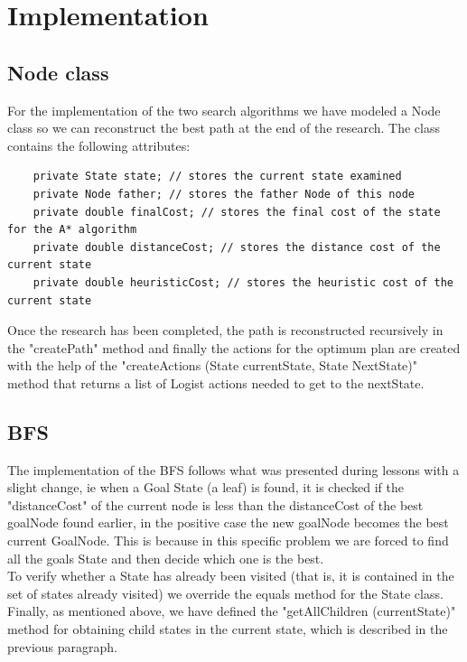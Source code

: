 \documentclass[11pt]{article}
\begin{document}
\section{Implementation}

\subsection {Node class}
For the implementation of the two search algorithms we have modeled a Node class so we can reconstruct the best path at the end of the research. The class contains the following attributes:
\begin{lstlisting}
    private State state; // stores the current state examined
    private Node father; // stores the father Node of this node
    private double finalCost; // stores the final cost of the state for the A* algorithm
    private double distanceCost; // stores the distance cost of the current state
    private double heuristicCost; // stores the heuristic cost of the current state
\end{lstlisting}Once the research has been completed, the path is reconstructed recursively in the "createPath" method and finally the actions for the optimum plan are created with the help of the "createActions (State currentState, State NextState)" method that returns a list of Logist actions needed to get to the nextState.

\subsection{BFS}
The implementation of the BFS follows what was presented during lessons with a slight change, ie when a Goal State (a leaf) is found, it is checked if the "distanceCost" of the current node is less than the distanceCost of the best goalNode found earlier, in the positive case the new goalNode becomes the best current GoalNode. This is because in this specific problem we are forced to find all the goals State and then decide which one is the best.
\\
To verify whether a State has already been visited (that is, it is contained in the set of states already visited) we override the equals method for the State class. Finally, as mentioned above, we have defined the "getAllChildren (currentState)" method for obtaining child states in the current state, which is described in the previous paragraph.
\end{document}

